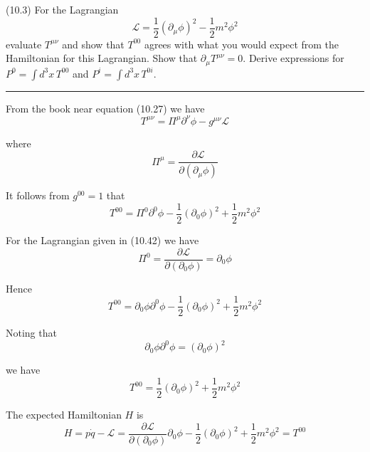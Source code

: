 \documentclass[12pt]{article}
\begin{document}
(10.3)
For the Lagrangian
\begin{equation*}
\mathcal L=\frac{1}{2}(\partial_\mu\phi)^2-\frac{1}{2}m^2\phi^2
\tag{10.42}
\end{equation*}
evaluate $T^{\mu\nu}$ and show that $T^{00}$ agrees with what
you would expect from the Hamiltonian for this Lagrangian.
Show that $\partial_\mu T^{\mu\nu}=0$. Derive expressions
for $P^0=\int d^3x\,T^{00}$ and $P^i=\int d^3x\,T^{0i}$.

\bigskip
\hrule

\bigskip
From the book near equation (10.27) we have
\begin{equation*}
T^{\mu\nu}=\Pi^\mu\partial^\nu\phi-g^{\mu\nu}\mathcal L
\end{equation*}

where
\begin{equation*}
\Pi^\mu=\frac{\partial\mathcal L}{\partial(\partial_\mu\phi)}
\end{equation*}

It follows from $g^{00}=1$ that
\begin{equation*}
T^{00}=\Pi^0\partial^0\phi-\frac{1}{2}(\partial_0\phi)^2+\frac{1}{2}m^2\phi^2
\end{equation*}

For the Lagrangian given in (10.42) we have
\begin{equation*}
\Pi^0=\frac{\partial\mathcal L}{\partial(\partial_0\phi)}=\partial_0\phi
\end{equation*}

Hence
\begin{equation*}
T^{00}=\partial_0\phi\partial^0\phi-\frac{1}{2}(\partial_0\phi)^2+\frac{1}{2}m^2\phi^2
\end{equation*}

Noting that
\begin{equation*}
\partial_0\phi\partial^0\phi=(\partial_0\phi)^2
\end{equation*}

we have
\begin{equation*}
T^{00}=\frac{1}{2}(\partial_0\phi)^2+\frac{1}{2}m^2\phi^2
\end{equation*}

The expected Hamiltonian $H$ is
\begin{equation*}
H=p\dot q-\mathcal L
=\frac{\partial\mathcal L}{\partial(\partial_0\phi)}\partial_0\phi-\frac{1}{2}(\partial_0\phi)^2+\frac{1}{2}m^2\phi^2
=T^{00}
\end{equation*}
\end{document}
